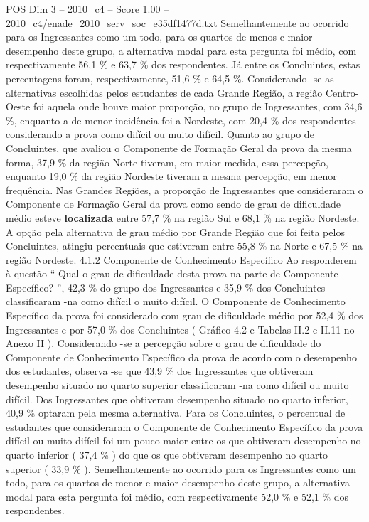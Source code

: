 \begin{textsample}{POS Dim 3 – 2010\_c4 – Score 1.00 – 2010\_c4/enade\_2010\_serv\_soc\_e35df1477d.txt}
Semelhantemente ao ocorrido para os Ingressantes como um todo, para os quartos de menos e maior desempenho deste grupo, a alternativa modal para esta pergunta foi médio, com respectivamente 56,1 \% e 63,7 \% dos respondentes.
Já entre os Concluintes, estas percentagens foram, respectivamente, 51,6 \% e 64,5 \%.
Considerando -se as alternativas escolhidas pelos estudantes de cada Grande Região, a região Centro-Oeste foi aquela onde houve maior proporção, no grupo de Ingressantes, com 34,6 \%, enquanto a de menor incidência foi a Nordeste, com 20,4 \% dos respondentes considerando a prova como difícil ou muito difícil.
Quanto ao grupo de Concluintes, que avaliou o Componente de Formação Geral da prova da mesma forma, 37,9 \% da região Norte tiveram, em maior medida, essa percepção, enquanto 19,0 \% da região Nordeste tiveram a mesma percepção, em menor frequência.
Nas Grandes Regiões, a proporção de Ingressantes que consideraram o Componente de Formação Geral da prova como sendo de grau de dificuldade médio esteve \textbf{localizada} entre 57,7 \% na região Sul e 68,1 \% na região Nordeste.
A opção pela alternativa de grau médio por Grande Região que foi feita pelos Concluintes, atingiu percentuais que estiveram entre 55,8 \% na Norte e 67,5 \% na região Nordeste. 4.1.2 Componente de Conhecimento Específico Ao responderem à questão “ Qual o grau de dificuldade desta prova na parte de Componente Específico? ”, 42,3 \% do grupo dos Ingressantes e 35,9 \% dos Concluintes classificaram -na como difícil o muito difícil.
O Componente de Conhecimento Específico da prova foi considerado com grau de dificuldade médio por 52,4 \% dos Ingressantes e por 57,0 \% dos Concluintes ( Gráfico 4.2 e Tabelas II.2 e II.11 no Anexo II ).
Considerando -se a percepção sobre o grau de dificuldade do Componente de Conhecimento Específico da prova de acordo com o desempenho dos estudantes, observa -se que 43,9 \% dos Ingressantes que obtiveram desempenho situado no quarto superior classificaram -na como difícil ou muito difícil.
Dos Ingressantes que obtiveram desempenho situado no quarto inferior, 40,9 \% optaram pela mesma alternativa.
Para os Concluintes, o percentual de estudantes que consideraram o Componente de Conhecimento Específico da prova difícil ou muito difícil foi um pouco maior entre os que obtiveram desempenho no quarto inferior ( 37,4 \% ) do que os que obtiveram desempenho no quarto superior ( 33,9 \% ).
Semelhantemente ao ocorrido para os Ingressantes como um todo, para os quartos de menor e maior desempenho deste grupo, a alternativa modal para esta pergunta foi médio, com respectivamente 52,0 \% e 52,1 \% dos respondentes.

\end{textsample}
